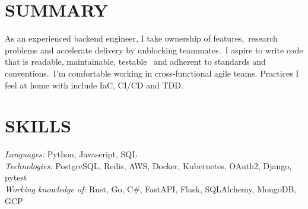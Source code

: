 \documentclass[line,margin]{res}
\begin{document}
\address{\href{mailto://simon.r.crowe@protonmail.com}{simon.r.crowe@protonmail.com}}


\begin{resume}

\section{SUMMARY} As an experienced backend engineer, I take ownership of features,\
                  research problems and accelerate delivery by unblocking teammates.\
                  I aspire to write code that is readable, maintainable, testable \
                  and adherent to standards and conventions.\
                  I'm comfortable working in cross-functional agile teams.
                  Practices I feel at home with include IaC, CI/CD and TDD.


\section{SKILLS} {\sl Languages:} Python, Javascript, SQL \\
                {\sl Technologies:} PostgreSQL, Redis, AWS, Docker, Kubernetes, OAuth2, Django, pytest \\
                {\sl Working knowledge of:} Rust, Go, C\#, FastAPI, Flask, SQLAlchemy, MongoDB, GCP



\end{resume}
\end{document}
